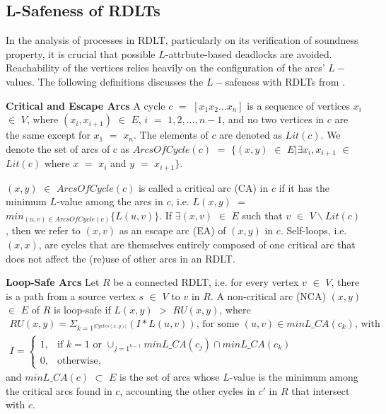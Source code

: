 \subsection*{L-Safeness of RDLTs}
In the analysis of processes in RDLT, particularly on its verification of soundness property, it is crucial that possible $L$-attrbute-based deadlocks are avoided. Reachability of the vertices relies heavily on the configuration of the arcs' $L-$values. The following definitions discusses the $L-$safeness with RDLTs from \cite{MalinaoPJS2023}.
\begin{defn}\textbf{Critical and Escape Arcs} \cite{MalinaoPJS2023}
    A cycle $ c $ $ = $ $ [ x_1 x_2 \ldots x_n ] $ is a sequence of vertices $ x_i $ $ \in $ $ V $, where $ (x_i,x_{i+1}) $ $ \in $ $ E $, $ i $ $ = $ $ 1,2, \ldots, n - 1 $, and no two vertices in $ c $ are the same except for $ x_1 $ $ = $ $ x_n $. The elements of $ c $ are denoted as $ Lit(c) $. We denote the set of arcs of $ c $ as $ ArcsOfCycle(c) $ $ = $ $ \{ (x,y) $ $ \in $ $ E | \exists x_i, x_{i+1} $ $ \in $ $ Lit(c) $ where $ x $ $ =  $ $ x_i $ and $ y $ $ = $ $ x_{i+1} \} $.

    $ (x,y) $ $ \in $ $ ArcsOfCycle(c) $ is called a critical arc (CA) in $ c $ if it has the minimum $ L $-value among the arcs in $ c $, i.e. $ L(x,y) $ $ = $ $ min_{(u,v) \in ArcsOfCycle(c) } \{L(u,v)\} $. If $ \exists (x,v) $ $ \in $ $ E $ such that $ v $ $ \in $ $ V \backslash Lit(c) $, then we refer to $ (x,v) $ as an escape arc (EA) of $ (x,y) $ in $ c $. Self-loops, i.e. $ (x,x) $, are cycles that are themselves entirely composed of one critical arc that does not affect the (re)use of other arcs in an RDLT.
\end{defn}

\begin{defn}\textbf{Loop-Safe Arcs} \cite{MalinaoPJS2023}
    \label{LSA}
    Let $ R $ be a connected RDLT, i.e. for every vertex $ v $ $ \in $ $ V $, there is a path from a source vertex $ s $ $ \in $ $ V $ to $ v $ in $ R $. A non-critical arc (NCA) $ (x,y) $ $ \in $ $ E $ of $ R $ is loop-safe if $ L(x,y) $ $ > $ $ RU(x,y) $, where
    \begin{gather*}
        RU(x,y) = \Sigma_{k=1^{|Cycles(x,y)|}} (I * L(u,v)) \text{, for some } (u,v) \in minL\_CA(c_k) \text{, with} \\
        I =
        \begin{cases}
            1, & \text{if } k = 1 \text{ or } \cup_{j=1^{k-1}} minL\_CA(c_j) \cap minL\_CA(c_k) \\
            0, & \text{otherwise,}
        \end{cases}
    \end{gather*}
    and $ minL\_CA(c) $ $ \subset $ $ E $ is the set of arcs whose $ L $-value is the minimum among the critical arcs found in $ c $, accounting the other cycles in $ c' $ in $ R $ that intersect with $ c $.
\end{defn}

